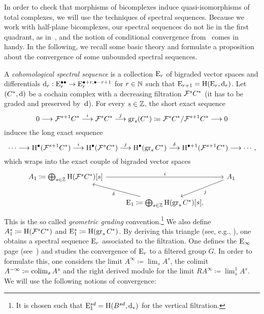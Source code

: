 \documentclass[\MainFolder/Text.tex]{subfiles}
\begin{document}
In order to check that morphisms of bicomplexes induce quasi-isomorphisms of total complexes, we will use the techniques of spectral sequences. Because we work with half-plane bicomplexes, our spectral sequences do not lie in the first quadrant, as in~\cite{Weibel1994}, and the notion of conditional convergence from~\cite{Boardmann1999} comes in handy. In the following, we recall some basic theory and formulate a proposition about the convergence of some unbounded spectral sequences.

A \emph{cohomological spectral sequence} is a collection $\mathrm{E}_r$ of bigraded vector spaces and differentials $\mathrm{d}_{r}: \mathrm{E}_r^{\bullet\bullet} \rightarrow \mathrm{E}_r^{\bullet+r,\bullet-r+1}$ for $r\in \mathbb{N}$ such that $\mathrm{E}_{r+1} = \mathrm{H}(\mathrm{E}_r,\mathrm{d}_r)$. Let $(C^*,\mathrm{d})$ be a cochain complex with a decreasing filtration $\mathcal{F}^s C^*$ (it has to be graded and preserved by~$\mathrm{d}$). For every $s\in \mathbb{Z}$, the short exact sequence
$$ 0\longrightarrow \mathcal{F}^{s+1} C^* \overset{i}{\longrightarrow} \mathcal{F}^s C^* \overset{j}{\longrightarrow} \operatorname{\mathrm{gr}}_s(C^*) \coloneqq \mathcal{F}^{s} C^* / \mathcal{F}^{s+1} C^* \longrightarrow 0 $$
induces the long exact sequence
$$\dotsb \longrightarrow \mathrm{H}^\bullet(\mathcal{F}^{s+1} C^*) \overset{i}{\longrightarrow}  \mathrm{H}^\bullet(\mathcal{F}^{s} C^*) \overset{j}{\longrightarrow} \mathrm{H}^\bullet(\operatorname{\mathrm{gr}}_s C^*) \overset{\delta}{\longrightarrow} \mathrm{H}^{\bullet+1}(\mathcal{F}^{s+1} C^*) \longrightarrow \dotsb, $$
which wraps into the exact couple of bigraded vector spaces
$$\begin{tikzcd}
A_1 \coloneqq \bigoplus_{s\in \Z} \H(\Filtr^s C^*)[s]  \arrow{rr}{i} && A_1 \arrow{dl}{j}\\
 & \SSPage_1 \coloneqq \bigoplus_{s\in \Z} \H(\Gr_s C^*)[s] \arrow{ul}{\delta}.
\end{tikzcd}$$
This is the so called \emph{geometric grading} convention.\footnote{It is chosen such that $\mathrm{E}_1^{sd} = \mathrm{H}(B^{sd},\mathrm{d}_{\mathrm{v}})$ for the vertical filtration.} We also define $A_1^s \coloneqq \mathrm{H}(\mathcal{F}^s C^*)$ and $\mathrm{E}_1^s \coloneqq \mathrm{H}(\operatorname{\mathrm{gr}}_s C^*)$. By deriving this triangle (see, e.g., \cite{Cieliebak2013}), one obtains a spectral sequence $\mathrm{E}_r$ associated to the filtration. One defines the $\mathrm{E}_\infty$ page (see~\cite{Boardmann1999}) and studies the convergence of $\mathrm{E}_r$ to a filtered group $G$. In order to formulate this, one considers the limit $A^\infty \coloneqq \lim_s A^s$, the colimit $A^{-\infty} \coloneqq \operatorname{colim}_s A^s$ and the right derived module for the limit $RA^\infty \coloneqq \lim_s^1 A^s$. We will use the following notions of convergence:
\end{document}
